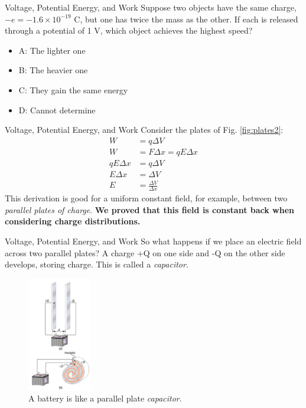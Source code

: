 \documentclass{beamer}
\begin{document}
\begin{frame}{Voltage, Potential Energy, and Work}
Suppose two objects have the same charge, $-e = -1.6\times 10^{-19}$ C, but one has twice the mass as the other.  If each is released through a potential of 1 V, which object achieves the highest speed?
\begin{itemize}
\item A: The lighter one
\item B: The heavier one
\item C: They gain the same energy
\item D: Cannot determine
\end{itemize}
\end{frame}

\begin{frame}{Voltage, Potential Energy, and Work}
Consider the plates of Fig. \ref{fig:plates2}:
\begin{align}
W &= q\Delta V \\
W &= F\Delta x = qE \Delta x \\
qE \Delta x &= q\Delta V \\
E \Delta x &= \Delta V \\
E &= \frac{\Delta V}{\Delta x}
\end{align}
This derivation is good for a uniform constant field, for example, between two \textit{parallel plates of charge}.  \textbf{We proved that this field is constant back when considering charge distributions.}
\end{frame}

\begin{frame}{Voltage, Potential Energy, and Work}
So what happens if we place an electric field across two parallel plates? A charge +Q on one side and -Q on the other side develops, storing charge.  This is called a \textit{capacitor}.
\begin{figure}
\centering
\includegraphics[width=0.25\textwidth]{figures/batt.png}
\caption{\label{fig:batt} A battery is like a parallel plate \textit{capacitor}.}
\end{figure}
\end{frame}
\end{document}
